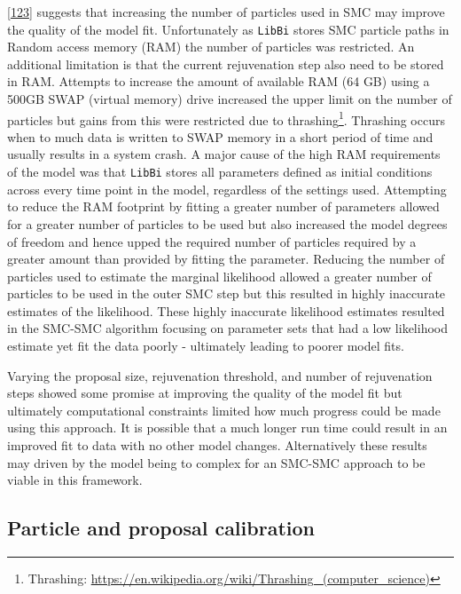 \documentclass[11pt,twoside]{bristolthesis}
\begin{document}
  {[}\protect\hyperlink{ref-Murray2015}{123}{]} suggests that increasing the number of particles used in SMC may improve the quality of the model fit. Unfortunately as \texttt{LibBi} stores SMC particle paths in Random access memory (RAM) the number of particles was restricted. An additional limitation is that the current rejuvenation step also need to be stored in RAM. Attempts to increase the amount of available RAM (64 GB) using a 500GB SWAP (virtual memory) drive increased the upper limit on the number of particles but gains from this were restricted due to thrashing\footnote{Thrashing: \url{https://en.wikipedia.org/wiki/Thrashing_(computer_science)}}. Thrashing occurs when to much data is written to SWAP memory in a short period of time and usually results in a system crash. A major cause of the high RAM requirements of the model was that \texttt{LibBi} stores all parameters defined as initial conditions across every time point in the model, regardless of the settings used. Attempting to reduce the RAM footprint by fitting a greater number of parameters allowed for a greater number of particles to be used but also increased the model degrees of freedom and hence upped the required number of particles required by a greater amount than provided by fitting the parameter. Reducing the number of particles used to estimate the marginal likelihood allowed a greater number of particles to be used in the outer SMC step but this resulted in highly inaccurate estimates of the likelihood. These highly inaccurate likelihood estimates resulted in the SMC-SMC algorithm focusing on parameter sets that had a low likelihood estimate yet fit the data poorly - ultimately leading to poorer model fits.
  
  Varying the proposal size, rejuvenation threshold, and number of rejuvenation steps showed some promise at improving the quality of the model fit but ultimately computational constraints limited how much progress could be made using this approach. It is possible that a much longer run time could result in an improved fit to data with no other model changes. Alternatively these results may driven by the model being to complex for an SMC-SMC approach to be viable in this framework.
  
  \hypertarget{particle-and-proposal-calibration}{%
  \subsection{Particle and proposal calibration}\label{particle-and-proposal-calibration}}
  
\end{document}
